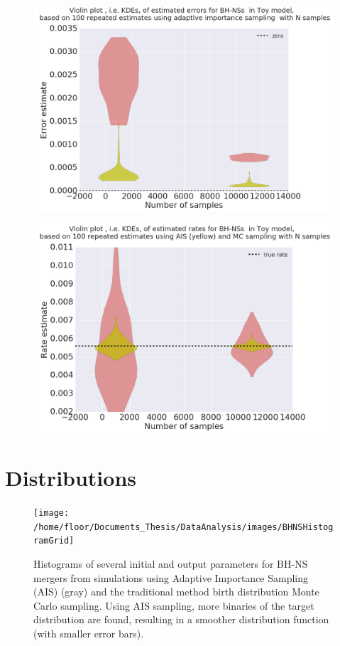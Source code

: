\documentclass[a4paper,fleqn,usenatbib]{mnras}
\begin{document}
\begin{figure}[h]
	{\includegraphics[width=1\linewidth]{images/ViolinErrorsCombined}}
\caption{}\label{fig:ToyModel-ViolinErrorsCombined}
\end{figure}

\begin{figure}[h]
	{\includegraphics[width=1\linewidth]{images/ViolinvCombined}}
\caption{}\label{fig:ToyModel-ViolinvCombined}
\end{figure}




\section{Distributions}

\begin{figure}
	{\texttt{[image: /home/floor/Documents\_Thesis/DataAnalysis/images/BHNSHistogramGrid]}}
\caption{Histograms of several initial and output parameters for BH-NS mergers from simulations using Adaptive Importance Sampling (AIS) (gray) and the traditional method birth distribution Monte Carlo sampling.  Using AIS sampling, more binaries of the target distribution are found, resulting in a smoother distribution function (with smaller error bars).}\label{fig:ToyModel-ViolinErrorsCombined}
\end{figure}




\bsp	%
\label{lastpage}
\end{document}
